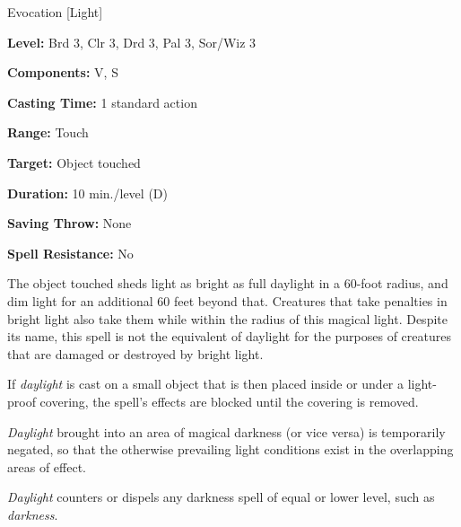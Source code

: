 
Evocation [Light]

\textbf{Level:} Brd 3, Clr 3, Drd 3, Pal 3, Sor/Wiz 3

\textbf{Components:} V, S

\textbf{Casting Time:} 1 standard action

\textbf{Range:} Touch

\textbf{Target:} Object touched

\textbf{Duration:} 10 min./level (D)

\textbf{Saving Throw:} None

\textbf{Spell Resistance:} No

The object touched sheds light as bright as full daylight in a 60-foot radius, 
and dim light for an additional 60 feet beyond that. Creatures that take penalties 
in bright light also take them while within the radius of this magical light. Despite 
its name, this spell is not the equivalent of daylight for the purposes of creatures 
that are damaged or destroyed by bright light.

If \textit{daylight} is cast on a small object that is then placed inside or under 
a light- proof covering, the spell's effects are blocked until the covering is 
removed.

\textit{Daylight} brought into an area of magical darkness (or vice versa) is temporarily 
negated, so that the otherwise prevailing light conditions exist in the overlapping 
areas of effect.

\textit{Daylight} counters or dispels any darkness spell of equal or lower level, 
such as \textit{darkness}.

